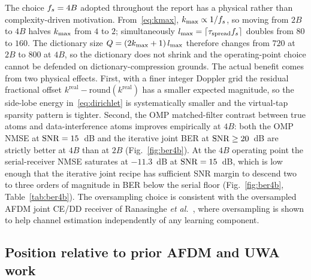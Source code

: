 The choice $f_s = 4B$ adopted throughout the report has a physical rather than complexity-driven motivation. From~\eqref{eq:kmax}, $k_{\max} \propto 1/f_s$, so moving from $2B$ to $4B$ halves $k_{\max}$ from $4$ to $2$; simultaneously $l_{\max} = \lceil \tau_{\text{spread}} f_s \rceil$ doubles from $80$ to $160$. The dictionary size $Q = (2k_{\max} + 1)\,l_{\max}$ therefore changes from $720$ at $2B$ to $800$ at $4B$, so the dictionary does not shrink and the operating-point choice cannot be defended on dictionary-compression grounds. The actual benefit comes from two physical effects. First, with a finer integer Doppler grid the residual fractional offset $k^\text{real} - \mathrm{round}(k^\text{real})$ has a smaller expected magnitude, so the side-lobe energy in~\eqref{eq:dirichlet} is systematically smaller and the virtual-tap sparsity pattern is tighter. Second, the OMP matched-filter contrast between true atoms and data-interference atoms improves empirically at $4B$: both the OMP NMSE at $\mathrm{SNR} = 15$~dB and the iterative joint BER at $\mathrm{SNR} \geq 20$~dB are strictly better at $4B$ than at $2B$ (Fig.~\ref{fig:ber4b}). At the $4B$ operating point the serial-receiver NMSE saturates at $-11.3$~dB at $\mathrm{SNR} = 15$~dB, which is low enough that the iterative joint recipe has sufficient SNR margin to descend two to three orders of magnitude in BER below the serial floor (Fig.~\ref{fig:ber4b}, Table~\ref{tab:ber4b}). The oversampling choice is consistent with the oversampled AFDM joint CE/DD receiver of Ranasinghe \emph{et al.}~\cite{ma2024oversampledafdm}, where oversampling is shown to help channel estimation independently of any learning component.

\subsection{Position relative to prior AFDM and UWA work}
\label{ssec:disc_priorart}

